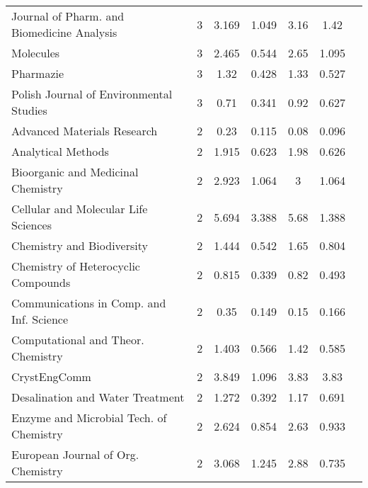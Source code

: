 {\begin{longtable}[c]{lcccccc}
  Journal of Pharm. and Biomedicine Analysis              & 3  & 3.169         & 1.049          & 3.16 & 1.42          \\
  Molecules                                               & 3  & 2.465         & 0.544          & 2.65 & 1.095         \\
  Pharmazie                                               & 3  & 1.32          & 0.428          & 1.33 & 0.527         \\[1ex]
  Polish Journal of Environmental Studies                 & 3  & 0.71          & 0.341          & 0.92 & 0.627         \\
  Advanced Materials Research                             & 2  & 0.23          & 0.115          & 0.08 & 0.096         \\
  Analytical Methods                                      & 2  & 1.915         & 0.623          & 1.98 & 0.626         \\
  Bioorganic and Medicinal Chemistry                      & 2  & 2.923         & 1.064          & 3    & 1.064         \\
  Cellular and Molecular Life Sciences                    & 2  & 5.694         & 3.388          & 5.68 & 1.388         \\[1ex]
  Chemistry and Biodiversity                              & 2  & 1.444         & 0.542          & 1.65 & 0.804         \\
  Chemistry of Heterocyclic Compounds                     & 2  & 0.815         & 0.339          & 0.82 & 0.493         \\
  Communications in Comp. and Inf. Science                & 2  & 0.35          & 0.149          & 0.15 & 0.166         \\
  Computational and Theor. Chemistry                      & 2  & 1.403         & 0.566          & 1.42 & 0.585         \\
  CrystEngComm                                            & 2  & 3.849         & 1.096          & 3.83 & 3.83          \\[1ex]
  Desalination and Water Treatment                        & 2  & 1.272         & 0.392          & 1.17 & 0.691         \\
  Enzyme and Microbial Tech. of Chemistry                 & 2  & 2.624         & 0.854          & 2.63 & 0.933         \\
  European Journal of Org. Chemistry                      & 2  & 3.068         & 1.245          & 2.88 & 0.735         \\

\end{longtable}}
